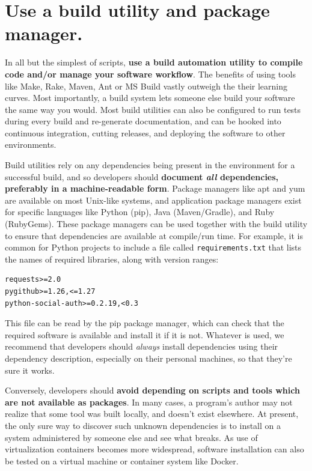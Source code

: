 \documentclass[10pt,letterpaper]{article}
\begin{document}
\section{Use a build utility and package manager.}

In all but the simplest of scripts, \textbf{use a build
automation utility to compile code and/or manage your software workflow}. The benefits of
using tools like Make, Rake, Maven, Ant or MS Build vastly outweigh the
their learning curves. Most importantly, a build system
lets someone else build your software the same way you would. Most build
utilities can also be configured to run tests during every build and
re-generate documentation, and can be hooked into continuous integration,
cutting releases, and deploying the software to other environments.

Build utilities rely on any dependencies being present in the environment for a
successful build, and so developers should
\textbf{document \emph{all} dependencies, preferably in a machine-readable form}.
Package managers like apt and yum are available on most Unix-like systems, and
application package managers exist for specific languages like Python (pip),
Java (Maven/Gradle), and Ruby (RubyGems). These package managers can be used
together with the build utility to ensure that dependencies are available at
compile/run time.
For example, it is common for Python projects to include a file called
\texttt{requirements.txt} that lists the names of required libraries,
along with version ranges:

\begin{verbatim}
requests>=2.0
pygithub>=1.26,<=1.27
python-social-auth>=0.2.19,<0.3
\end{verbatim}

This file can be read by the pip package manager, which can check that the
required software is available and install it if it is not. 
Whatever is used,
we recommend that developers should \emph{always} install dependencies
using their dependency description, especially on their personal machines, so that
they're sure it works.

Conversely, developers should
\textbf{avoid depending on scripts and tools which are not available as packages}.
In many cases, a program's author may not realize that some tool was built locally, and
doesn't exist elsewhere. At present, the only sure way to discover such
unknown dependencies is to install on a system administered by someone
else and see what breaks. As use of virtualization containers becomes more
widespread, software installation can also be tested on a virtual machine or
container system like Docker.
\end{document}
